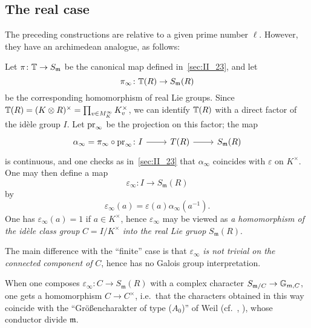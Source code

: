 \subsection{The real case}
The preceding constructions are relative to a given prime number $\ell$.
However, they have an archimedean analogue, as follows: 

Let $\pi \colon \mathbb{T} \to S_\mathfrak{m}$ be the canonical map defined 
in~\ref{sec:II_23}, and let 
\[
	\pi_{\infty} \colon \mathbb{T}(R) \to S_\mathfrak{m}(R)
\]
be the corresponding homomorphism of real Lie groups. Since $\mathbb{T}(R) = (K
\otimes R)^{\times} = \prod_{v \in M_K^\infty} K_v^{\times}$, we can identify
$\mathbb{T}(R)$ with a direct factor of the idèle group $I$. Let $\operatorname{pr}_\infty$ be the
projection on this factor; the map 
\dpage
\[\begin{tikzcd}
	\alpha_\infty = \pi_\infty \circ \pr_\infty \colon I \arrow[r] & T(R) 
	\arrow[r] & S_\mathfrak{m}(R)
\end{tikzcd}\]
is continuous, and one checks as in~\ref{sec:II_23} that $\alpha_\infty$ 
coincides with $\varepsilon$ on $K^{\times}$. One may then define a map
\[
	\varepsilon_{\infty} \colon I \rightarrow S_{\mathfrak{m}}(R)
\]
by 
\[
	\varepsilon_\infty(a) = \varepsilon(a)\alpha_\infty(a^{-1}).
\]
One has $\varepsilon_\infty(a) = 1$ if $a \in K^{\times}$, hence 
$\varepsilon_\infty$ may be viewed as \emph{a homomorphism of the idèle 
class group} $C = I/K^{\times}$ \emph{into the real Lie gruop} $S_\mathfrak{m}
(R)$.

The main difference with the ``finite'' case is that $\varepsilon_\infty$ 
\emph{is not trivial on the connected component of} $C$, hence has no Galois 
group interpretation.

When one composes $\varepsilon_\infty \colon C \to S_\mathfrak{m}(R)$ with a 
complex character $S_{\mathfrak{m}/C} \to \mathbb{G}_{m, C}$, one gets a 
homomorphism $C \to C^{\times}$, i.e.\ that the characters obtained in this way 
coincide with the ``Gr\"o\ss encharakter of type ($A_0$)'' of Weil (cf.\ 
\cite{35}, \cite{41}), whose conductor divide $\mathfrak{m}$.

